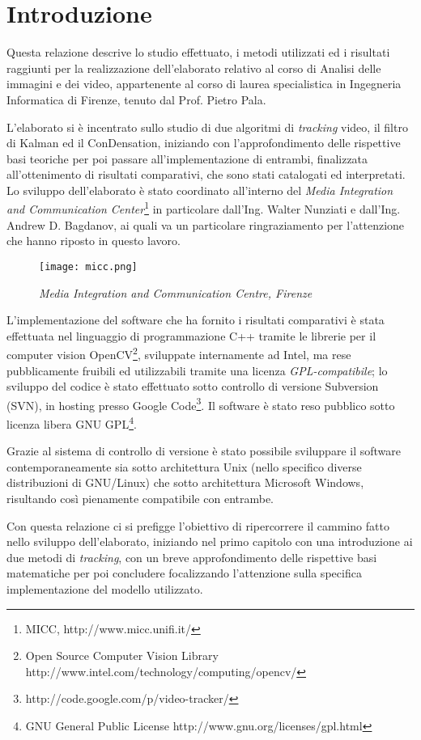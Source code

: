 \section{Introduzione}
Questa relazione descrive lo studio effettuato, i metodi utilizzati ed i risultati raggiunti per la realizzazione dell'elaborato relativo al corso di Analisi delle immagini e dei video, appartenente al corso di laurea specialistica in Ingegneria Informatica di Firenze, tenuto dal Prof. Pietro Pala.

L'elaborato si è incentrato sullo studio di due algoritmi di \textit{tracking} video, il filtro di Kalman ed il ConDensation, iniziando con l'approfondimento delle rispettive basi teoriche per poi passare all'implementazione di entrambi, finalizzata all'ottenimento di risultati comparativi, che sono stati catalogati ed interpretati. Lo sviluppo dell'elaborato è stato coordinato all'interno del \textit{Media Integration and Communication Center}\footnote{MICC, http://www.micc.unifi.it/} in particolare dall'Ing. Walter Nunziati e dall'Ing. Andrew D. Bagdanov, ai quali va un particolare ringraziamento per l'attenzione che hanno riposto in questo lavoro.
\begin{figure}[hb]
\centering
	\texttt{[image: micc.png]}
\caption{\textit{Media Integration and Communication Centre, Firenze}\label{fig:micc}}
\end{figure}

L'implementazione del software che ha fornito i risultati comparativi è stata effettuata nel linguaggio di programmazione C++ tramite le librerie per il computer vision OpenCV\footnote{Open Source Computer Vision Library http://www.intel.com/technology/computing/opencv/}, sviluppate internamente ad Intel, ma rese pubblicamente fruibili ed utilizzabili tramite una licenza \textit{GPL-compatibile}; lo sviluppo del codice è stato effettuato sotto controllo di versione Subversion (SVN), in hosting presso Google Code\footnote{http://code.google.com/p/video-tracker/}. Il software è stato reso pubblico sotto licenza libera GNU GPL\footnote{GNU General Public License http://www.gnu.org/licenses/gpl.html}.

Grazie al sistema di controllo di versione è stato possibile sviluppare il software contemporaneamente sia sotto architettura Unix (nello specifico diverse distribuzioni di GNU/Linux) che sotto architettura Microsoft Windows, risultando così pienamente compatibile con entrambe.

Con questa relazione ci si prefigge l'obiettivo di ripercorrere il cammino fatto nello sviluppo dell'elaborato, iniziando nel primo capitolo con una introduzione ai due metodi di \textit{tracking}, con un breve approfondimento delle rispettive basi matematiche per poi concludere focalizzando l'attenzione sulla specifica implementazione del modello utilizzato.

